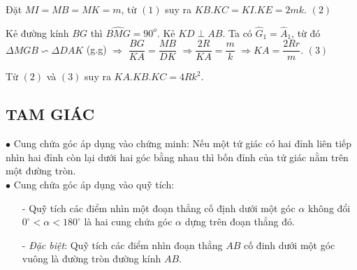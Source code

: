 \begin{bt}
{\begin{enumerate}
 			Đặt $MI = MB = MK = m$, từ $(1)$ suy ra $KB. KC = KI. KE = 2mk$. \hspace{\fill} $(2)$\smallskip
 			
 			Kẻ đường kính $BG$ thì $\widehat{BMG} = 90^o$. Kẻ $KD \perp AB$. Ta có $\widehat{G}_1 = \widehat{A}_1$, từ đó $\Delta MGB \backsim \Delta DAK$ (g.g) $\Rightarrow$ $\dfrac{BG}{KA} = \dfrac{MB}{DK}$ $\Rightarrow \dfrac{2R}{KA} = \dfrac{m}{k}$ $\Rightarrow KA = \dfrac{2Rr}{m}.$ \hspace{\fill} $(3)$\smallskip
 			
 			Từ $(2)$ và $(3)$ suy ra $KA. KB. KC = 4Rk^2.$
 			
 			
 	\end{enumerate}}
 \end{bt}  
\subsection{TAM GIÁC}
$\bullet$ Cung chứa góc áp dụng vào chứng minh: Nếu một tứ giác có hai đỉnh liên tiếp nhìn hai đỉnh còn lại dưới hai góc bằng nhau thì bốn đỉnh của tứ giác nằm trên một đường tròn.\\
$\bullet$ Cung chứa góc áp dụng vào quỹ tích:
\begin{enumerate}
	\item[-] Quỹ tích các điểm nhìn một đoạn thẳng cố định dưới một góc $\alpha$ không đổi $0^{\circ}<\alpha<180^{\circ}$ là hai cung chứa góc $\alpha$ dựng trên đoạn thẳng đó.
	\item[-] \textit{Đặc biệt}: Quỹ tích các điểm nhìn đoạn thẳng $AB$ cố đinh dưới một góc vuông là đường tròn đường kính $AB$.
\end{enumerate}
